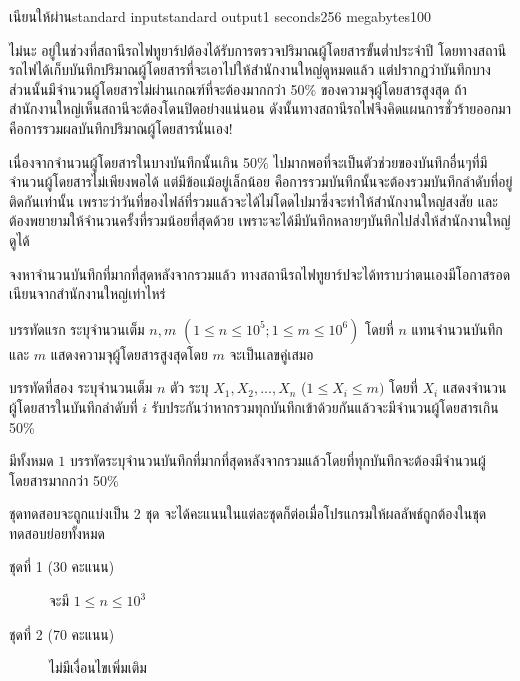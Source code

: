 \documentclass[11pt,a4paper]{article}
\begin{document}
\begin{problem}{เนียนให้ผ่าน}{standard input}{standard output}{1 seconds}{256 megabytes}{100}


ไม่นะ อยู่ในช่วงที่สถานีรถไฟทูยาร์ปต้องได้รับการตรวจปริมาณผู้โดยสารขั้นต่ำประจำปี โดยทางสถานีรถไฟได้เก็บบันทึกปริมาณผู้โดยสารที่จะเอาไปให้สำนักงานใหญ่ดูหมดแล้ว แต่ปรากฏว่าบันทึกบางส่วนนั้นมีจำนวนผู้โดยสารไม่ผ่านเกณฑ์ที่จะต้องมากกว่า 50\% ของความจุผู้โดยสารสูงสุด ถ้าสำนักงานใหญ่เห็นสถานีจะต้องโดนปิดอย่างแน่นอน ดังนั้นทางสถานีรถไฟจึงคิดแผนการชั่วร้ายออกมาคือการรวมผลบันทึกปริมาณผู้โดยสารนั่นเอง!

	เนื่องจากจำนวนผู้โดยสารในบางบันทึกนั้นเกิน 50\% ไปมากพอที่จะเป็นตัวช่วยของบันทึกอื่นๆที่มีจำนวนผู้โดยสารไม่เพียงพอได้ แต่มีข้อแม้อยู่เล็กน้อย คือการรวมบันทึกนั้นจะต้องรวมบันทึกลำดับที่อยู่ติดกันเท่านั้น เพราะว่าวันที่ของไฟล์ที่รวมแล้วจะได้ไม่โดดไปมาซึ่งจะทำให้สำนักงานใหญ่สงสัย และต้องพยายามให้จำนวนครั้งที่รวมน้อยที่สุดด้วย เพราะจะได้มีบันทึกหลายๆบันทึกไปส่งให้สำนักงานใหญ่ดูได้

	จงหาจำนวนบันทึกที่มากที่สุดหลังจากรวมแล้ว ทางสถานีรถไฟทูยาร์ปจะได้ทราบว่าตนเองมีโอกาสรอดเนียนจากสำนักงานใหญ่เท่าไหร่ 

\InputFile
บรรทัดแรก ระบุจำนวนเต็ม $ n,m$ $( 1\leq n\leq10^5 ; 1\leq m\leq10^6)$ โดยที่ $n$ แทนจำนวนบันทึกและ $m$ แสดงความจุผู้โดยสารสูงสุดโดย $m$ จะเป็นเลขคู่เสมอ

บรรทัดที่สอง ระบุจำนวนเต็ม $n$ ตัว ระบุ $X_1, X_2, ..., X_n$ ($1\leq X_i\leq m
)$ โดยที่  $X_i$ แสดงจำนวนผู้โดยสารในบันทึกลำดับที่ $i$ รับประกันว่าหากรวมทุกบันทึกเข้าด้วยกันแล้วจะมีจำนวนผู้โดยสารเกิน 50\% 

\OutputFile
มีทั้งหมด $1$ บรรทัดระบุจำนวนบันทึกที่มากที่สุดหลังจากรวมแล้วโดยที่ทุกบันทึกจะต้องมีจำนวนผู้โดยสารมากกว่า 50\%

\Scoring
ชุดทดสอบจะถูกแบ่งเป็น 2 ชุด จะได้คะแนนในแต่ละชุดก็ต่อเมื่อโปรแกรมให้ผลลัพธ์ถูกต้องในชุดทดสอบย่อยทั้งหมด

\begin{description}

\item[ชุดที่ 1 (30 คะแนน)] จะมี $ 1\leq n\leq10^3$

\item[ชุดที่ 2 (70 คะแนน)] ไม่มีเงื่อนไขเพิ่มเติม

\end{description}

\Examples

\begin{example}
%
%
\end{example}


\end{problem}
\end{document}
